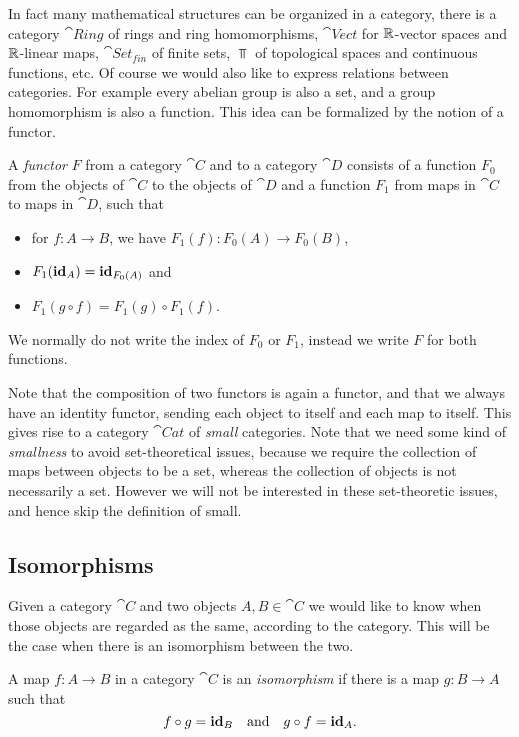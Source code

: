 In fact many mathematical structures can be organized in a category, there is a category $\cat{Ring}$ of rings and ring homomorphisms, $\cat{Vect}$ for $\mathbb{R}$-vector spaces and $\mathbb{R}$-linear maps, $\cat{Set_{fin}}$ of finite sets, $\Top$ of topological spaces and continuous functions, etc. Of course we would also like to express relations between categories. For example every abelian group is also a set, and a group homomorphism is also a function. This idea can be formalized by the notion of a functor.

\begin{definition}
	A \emph{functor} $F$ from a category $\cat{C}$ and to a category $\cat{D}$ consists of a function $F_0$ from the objects of $\cat{C}$ to the objects of $\cat{D}$ and a function $F_1$ from maps in $\cat{C}$ to maps in $\cat{D}$, such that
	\begin{itemize}
		\item for $f: A \to B$, we have $F_1(f): F_0(A) \to F_0(B)$,
		\item $F_1(\mathbf{id}_A) = \mathbf{id}_{F_0(A)}$ and
		\item $F_1(g \circ f) = F_1(g) \circ F_1(f)$.
	\end{itemize}
	We normally do not write the index of $F_0$ or $F_1$, instead we write $F$ for both functions.
\end{definition}

Note that the composition of two functors is again a functor, and that we always have an identity functor, sending each object to itself and each map to itself. This gives rise to a category $\cat{Cat}$ of \emph{small} categories. Note that we need some kind of \emph{smallness} to avoid set-theoretical issues, because we require the collection of maps between objects to be a set, whereas the collection of objects is not necessarily a set. However we will not be interested in these set-theoretic issues, and hence skip the definition of small.

\subsection{Isomorphisms}
Given a category $\cat{C}$ and two objects $A, B \in \cat{C}$ we would like to know when those objects are regarded as the same, according to the category. This will be the case when there is an isomorphism between the two.

\begin{definition}
	A map $f: A \to B$ in a category $\cat{C}$ is an \emph{isomorphism} if there is a map $g: B \to A$ such that
	$$ f \circ g = \mathbf{id}_B \quad\text{and}\quad g \circ f = \mathbf{id}_A.$$
\end{definition}

